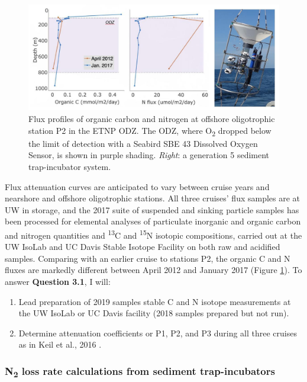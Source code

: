 \documentclass[12pt, letterpaper, twoside]{article}
\begin{document}
\begin{figure}
	\includegraphics[width=\linewidth]{etnp-flux-trap.jpg}
	\caption{Flux profiles of organic carbon and nitrogen at offshore oligotrophic station P2 in the ETNP ODZ. The ODZ, where O\textsubscript{2} dropped below the limit of detection with a Seabird SBE 43 Dissolved Oxygen Sensor, is shown in purple shading. \textit{Right}: a generation 5 sediment trap-incubator system.}
	\label{fig:etnp flux}
\end{figure}

Flux attenuation curves are anticipated to vary between cruise years and nearshore and offshore oligotrophic stations. All three cruises' flux samples are at UW in storage, and the 2017 suite of suspended and sinking particle samples has been processed for elemental analyses of particulate inorganic and organic carbon and nitrogen quantities and \textsuperscript{13}C and \textsuperscript{15}N isotopic compositions, carried out at the UW IsoLab and UC Davis Stable Isotope Facility on both raw and acidified samples. Comparing with an earlier cruise to stations P2, the organic C and N fluxes are markedly different between April 2012 and January 2017 (Figure \ref{fig:etnp flux}). To answer \textbf{Question 3.1}, I will:

\begin{enumerate}
	\item[1.] Lead preparation of 2019 samples stable C and N isotope measurements at the UW IsoLab or UC Davis facility (2018 samples prepared but not run).
	\item[2.] Determine attenuation coefficients or P1, P2, and P3 during all three cruises as in Keil et al., 2016 \cite{keil_multiproxy_2016}.
\end{enumerate}

\subsubsection{N\textsubscript{2} loss rate calculations from sediment trap-incubators}
\end{document}
